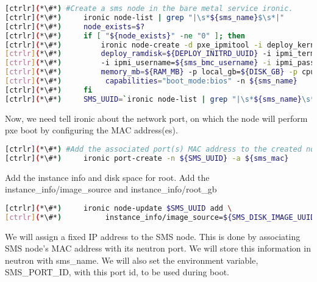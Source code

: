 
\begin{lstlisting}[language=bash,keywords={}]
[ctrlr](*\#*) #Create a sms node in the bare metal service ironic.
[ctrlr](*\#*)     ironic node-list | grep "|\s*${sms_name}$\s*|"
[ctrlr](*\#*)     node_exists=$?
[ctrlr](*\#*)     if [ "${node_exists}" -ne "0" ]; then 
[ctrlr](*\#*)         ironic node-create -d pxe_ipmitool -i deploy_kernel=${DEPLOY_VMLINUZ_UUID} -i \
[ctrlr](*\#*)         deploy_ramdisk=${DEPLOY_INITRD_UUID} -i ipmi_terminal_port=8023 -i ipmi_address=${sms_bmc} \
[ctrlr](*\#*)         -i ipmi_username=${sms_bmc_username} -i ipmi_password=${sms_bmc_password} -p cpus=${CPU} -p \
[ctrlr](*\#*)         memory_mb=${RAM_MB} -p local_gb=${DISK_GB} -p cpu_arch=${ARCH} -p \
[ctrlr](*\#*)          capabilities="boot_mode:bios" -n ${sms_name}
[ctrlr](*\#*)     fi
[ctrlr](*\#*)     SMS_UUID=`ironic node-list | grep "|\s*${sms_name}\s*|" | awk '{print $2}'`
\end{lstlisting} 

	Now, we need tell ironic about the network port, on which the node will perform pxe boot by configuring the MAC address(es). 



\begin{lstlisting}[language=bash,keywords={}]
[ctrlr](*\#*) #Add the associated port(s) MAC address to the created node(s)
[ctrlr](*\#*)     ironic port-create -n ${SMS_UUID} -a ${sms_mac}
\end{lstlisting} 

Add the instance info and disk space for root. \newline
	Add the instance\_info/image\_source and instance\_info/root\_gb
    

\begin{lstlisting}[language=bash,keywords={}]
[ctrlr](*\#*)     ironic node-update $SMS_UUID add \
[ctrlr](*\#*)          instance_info/image_source=${SMS_DISK_IMAGE_UUID} instance_info/root_gb=50
\end{lstlisting} 


	We will assign a fixed IP address to the SMS node. This is done by associating SMS node’s MAC address with its neutron port. We will store this information in neutron with sms\_name. We will also set the environment variable, SMS\_PORT\_ID, with this port id, to be used during boot.

